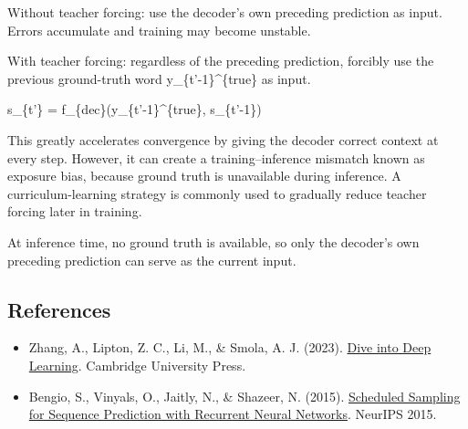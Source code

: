 Without teacher forcing: use the decoder's own preceding prediction as input. Errors accumulate and training may become unstable.

With teacher forcing: regardless of the preceding prediction, forcibly use the previous ground-truth word y\_\{t'-1\}\^{}\{true\} as input.

s\_\{t'\} = f\_\{dec\}(y\_\{t'-1\}\^{}\{true\}, s\_\{t'-1\})

This greatly accelerates convergence by giving the decoder correct context at every step. However, it can create a training--inference mismatch known as exposure bias, because ground truth is unavailable during inference. A curriculum-learning strategy is commonly used to gradually reduce teacher forcing later in training.

At inference time, no ground truth is available, so only the decoder's own preceding prediction can serve as the current input.

\FloatBarrier
{}
\hypertarget{references-19}{%
\subsection{References}\label{references-19}}

\vspace{0.25em}
\begin{itemize}
\tightlist
\item
  Zhang, A., Lipton, Z. C., Li, M., \& Smola, A. J. (2023). \href{https://D2L.ai}{Dive into Deep Learning}. Cambridge University Press.
\item
  Bengio, S., Vinyals, O., Jaitly, N., \& Shazeer, N. (2015). \href{https://proceedings.neurips.cc/paper/2015/hash/e995f98d56967d946471af29d7bf99f1-Abstract.html}{Scheduled Sampling for Sequence Prediction with Recurrent Neural Networks}. NeurIPS 2015.
\end{itemize}

\clearpage
